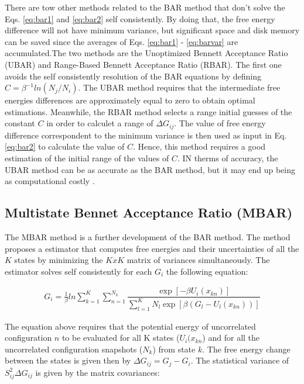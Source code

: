 There are tow other methods related to the BAR method that don't solve the Eqs. \eqref{eq:bar1} and \eqref{eq:bar2} self consistently. By doing that, the free energy difference will not have minimum variance, but significant space and disk memory can be saved since the averages of Eqs. \eqref{eq:bar1} - \eqref{eq:barvar} are accumulated.The two methods are the Unoptimized Bennett Acceptance Ratio (UBAR) and Range-Based Bennett Acceptance Ratio (RBAR). The first one avoids the self consistently resolution of the BAR equations by defining $C=\beta^{-1}ln(N_{j}/N_{i})$. The UBAR method requires that the intermediate free energies differences are approximately equal to zero to obtain optimal estimations. Meanwhile, the RBAR method selects a range initial guesses of the constant $C$ in order to calculet a range  of $\Delta G_{ij}$. The value of free energy difference correspondent to the minimum variance is then used as input in Eq. \eqref{eq:bar2} to calculate the value of $C$. Hence, this method requires a good estimation of the initial range of the values of $C$. IN therms of accuracy, the UBAR method can be as accurate as the BAR method, but it may end up being as computational costly \cite{bareva}.  

\subsection{Multistate Bennet Acceptance Ratio (MBAR)}

The MBAR method \cite{mbar} is a further development of the BAR method. The method proposes a estimator that computes free energies and their uncertainties of all the $K$ states  by minimizing the $KxK$ matrix of variances simultaneously. The estimator solves self consistently for each $G_{i}$ the following equation:

\begin{equation}
\label{eq:mbar}
\begin{aligned}
 G_{i} = \frac{1}{\beta}ln \sum_{k=1}^{K} \sum_{n=1}^{N_{k}}
 \dfrac{\exp[-\beta U_{i}(x_{kn})]}{\sum_{l=1}^{K} N_{l} \exp[\beta (G_{l} - U_{l}(x_{kn}))]}
\end{aligned}
\end{equation}

The equation above requires that the potential energy  of uncorrelated configuration $n$ to be evaluated for all K states ($U_{i}(x_{kn}$) and for all the uncorrelated configuration snapshots ($N_{k}$) from state $k$. The free energy change between the states is given then by $\Delta G_{ij} = G_{j} -  G_{i}$. The statistical variance of $S_{ij}^{2} \Delta G_{ij}$ is given by the matrix covariances:

